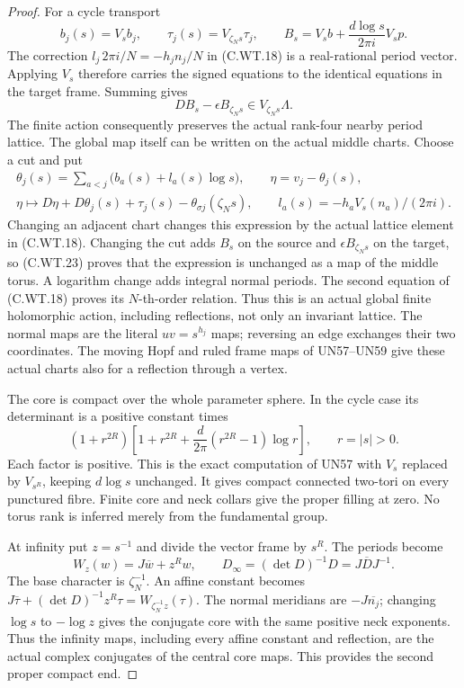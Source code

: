\begin{proof}
For a cycle transport
\[
 b_j(s)=V_s b_j,\qquad
 \tau_j(s)=V_{\zeta_Ns}\tau_j,\qquad
 B_s=V_s b+\frac{d\log s}{2\pi i}V_s p .
 \tag{C.WT.22}
\]
The correction
\(l_j\,2\pi i/N=-h_jn_j/N\)
in (C.WT.18) is a real-rational
period vector. Applying \(V_s\)
therefore carries the signed
equations to the identical
equations in the target frame.
Summing gives
\[
                 D B_s-\epsilon B_{\zeta_Ns}
                               \in V_{\zeta_Ns}\Lambda .
 \tag{C.WT.23}
\]
The finite action consequently
preserves the actual rank-four
nearby period lattice. The
global map itself can be
written on the actual middle
charts. Choose a cut and put
\[
 \begin{gathered}
 \theta_j(s)=\sum_{a<j}
      \bigl(b_a(s)+l_a(s)\log s\bigr),\qquad
 \eta=v_j-\theta_j(s),\\
 \eta\longmapsto
 D\eta+D\theta_j(s)+\tau_j(s)
                         -\theta_{\sigma j}(\zeta_Ns),
 \qquad l_a(s)=-h_aV_s(n_a)/(2\pi i).
 \end{gathered}
 \tag{C.WT.23a}
\]
Changing an adjacent chart
changes this expression by
the actual lattice element
in (C.WT.18). Changing the
cut adds \(B_s\) on the source
and \(\epsilon B_{\zeta_Ns}\)
on the target, so (C.WT.23)
proves that the expression
is unchanged as a map of
the middle torus. A logarithm
change adds integral normal
periods. The second equation
of (C.WT.18) proves its
\(N\)-th-order relation.
Thus this is an actual
global finite holomorphic
action, including reflections,
not only an invariant lattice.
The
normal maps are the literal
\(uv=s^{h_j}\) maps; reversing
an edge exchanges their two
coordinates. The moving
Hopf and ruled frame maps
of UN57--UN59 give these
actual charts also for a
reflection through a vertex.

The core is compact over the
whole parameter sphere. In
the cycle case its determinant
is a positive constant times
\[
 (1+r^{2R})
 \left[1+r^{2R}
    +\frac d{2\pi}(r^{2R}-1)\log r\right],
                \qquad r=|s|>0 .
 \tag{C.WT.24}
\]
Each factor is positive.
This is the exact computation
of UN57 with \(V_s\) replaced
by \(V_{s^R}\), keeping
\(d\log s\) unchanged.
It gives compact connected
two-tori on every punctured
fibre. Finite core and neck
collars give the proper
filling at zero. No torus
rank is inferred merely
from the fundamental group.

At infinity put \(z=s^{-1}\)
and divide the vector frame
by \(s^R\). The periods become
\[
              W_z(w)=J\overline w+z^Rw,\qquad
              D_{\infty}=(\det D)^{-1}D
                       =J\overline D J^{-1}.
 \tag{C.WT.25}
\]
The base character is
\(\zeta_N^{-1}\). An affine
constant becomes
\(J\overline\tau+(\det D)^{-1}z^R\tau
=W_{\zeta_N^{-1}z}(\tau)\).
The normal meridians are
\(-J\overline{n_j}\); changing
\(\log s\) to \(-\log z\)
gives the conjugate core
with the same positive neck
exponents. Thus the infinity
maps, including every affine
constant and reflection, are
the actual complex conjugates
of the central core maps.
This provides the second
proper compact end.


\end{proof}
